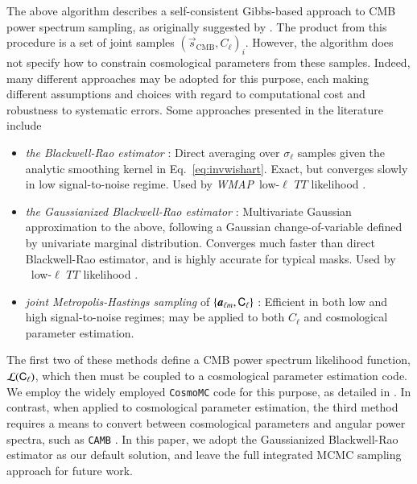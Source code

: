 \documentclass[onecolumn]{aa}
\def\WMAP{\emph{WMAP}}
\newcommand{\s}[0]{\vec{s}}
\renewcommand{\a}[0]{\vec{a}}
\renewcommand{\C}[0]{\tens{C}}
\newcommand{\BP}{\textsc{BeyondPlanck}}
\begin{document}
The above algorithm describes a self-consistent Gibbs-based approach to CMB
power spectrum sampling, as originally suggested by
\citet{wandelt2004}. The product from this procedure is a set of joint
samples $(\s_{\mathrm{CMB}}, C_{\ell})_i$. However, the algorithm does
not specify how to constrain cosmological parameters from these
samples. Indeed, many different approaches may be adopted for this
purpose, each making different assumptions and choices with regard to
computational cost and robustness to systematic errors. Some
approaches presented in the literature include
\begin{itemize}
\item \emph{the Blackwell-Rao estimator} \citep{chu2005}: Direct
  averaging over $\sigma_{\ell}$ samples given the analytic smoothing
  kernel in Eq.~\eqref{eq:invwishart}. Exact, but converges slowly in
  low signal-to-noise regime. Used by \WMAP\ low-$\ell$ $TT$
  likelihood \citep{hinshaw2012}.
\item \emph{the Gaussianized Blackwell-Rao estimator}
  \citep{rudjord:2009}: Multivariate Gaussian approximation to the
  above, following a Gaussian change-of-variable defined by univariate
  marginal distribution. Converges much faster than direct
  Blackwell-Rao estimator, and is highly accurate for typical
  masks. Used by \Planck\ low-$\ell$ $TT$ likelihood
  \citep[e.g.,][]{planck2016-l05}.
\item \emph{joint Metropolis-Hastings sampling} of $\{\a_{\ell m},
  \C_{\ell}\}$ \citep{jewell:2009,racine:2016}: Efficient in both low
  and high signal-to-noise regimes; may be applied to both $C_{\ell}$
  and cosmological parameter estimation. %
\end{itemize}
The first two of these methods define a CMB power spectrum likelihood
function, $\mathcal{L}(\C_{\ell})$, which then must be coupled to a
cosmological parameter estimation code. We employ the widely employed
\texttt{CosmoMC} \citep{cosmomc} code for this purpose, as detailed in
\citet{bp12}. In contrast, when applied to cosmological parameter
estimation, the third method requires a means to convert between
cosmological parameters and angular power spectra, such as \texttt{CAMB}
\citep{Lewis:1999bs}. In this paper, we adopt the
Gaussianized Blackwell-Rao estimator as our default solution, and
leave the full integrated MCMC sampling approach for future work.
\end{document}
